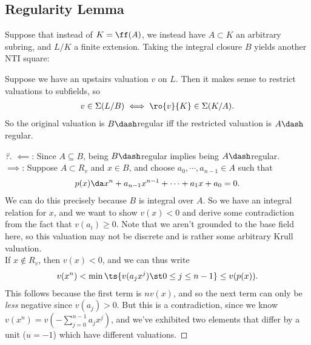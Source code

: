 \hypertarget{regularity-lemma}{%
\subsection{Regularity Lemma}\label{regularity-lemma}}

\begin{proposition}

Suppose that instead of \(K = \ff(A)\), we instead have \(A \subset K\)
an arbitrary subring, and \(L/K\) a finite extension. Taking the
integral closure \(B\) yields another NTI square:

\begin{center}\end{center}

Suppose we have an upstairs valuation \(v\) on \(L\). Then it makes
sense to restrict valuations to subfields, so
\begin{align*}  
v\in \Sigma(L/B) \iff \ro{v}{K} \in \Sigma(K/A)
.\end{align*} So the original valuation is \(B\dash\)regular iff the
restricted valuation is \(A\dash\)regular.

\end{proposition}

\begin{proof}[?]

\(\impliedby\): Since \(A \subseteq B\), being \(B\dash\)regular implies
being \(A\dash\)regular.\\

\(\implies\): Suppose \(A \subset R_v\) and \(x\in B\), and choose
\(a_0, \cdots, a_{n-1} \in A\) such that
\begin{align*}  
p(x) \da x^n + a_{n-1}x^{n-1} + \cdots + a_1 x + a_0 = 0
.\end{align*} We can do this precisely because \(B\) is integral over
\(A\). So we have an integral relation for \(x\), and we want to show
\(v(x) < 0\) and derive some contradiction from the fact that
\(v(a_i) \geq 0\). Note that we aren't grounded to the base field here,
so this valuation may not be discrete and is rather some arbitrary Krull
valuation.\\

If \(x\not \in R_v\), then \(v(x) < 0\), and we can thus write
\begin{align*}  
v(x^n) < \min \ts{ v(a_j x^j) \st 0\leq j \leq n-1 } \leq v(p(x))
.\end{align*} This follows because the first term is \(nv(x)\), and so
the next term can only be \emph{less} negative since \(v(a_j) > 0\). But
this is a contradiction, since we know
\(v(x^n) = v(- \sum_{j=0}^{n-1} a_j x^j)\), and we've exhibited two
elements that differ by a unit (\(u=-1\)) which have different
valuations.

\end{proof}

